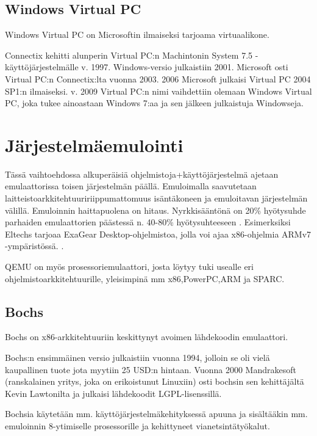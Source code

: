 \subsection{Windows Virtual PC}
Windows Virtual PC on Microsoftin ilmaiseksi tarjoama virtuaalikone.

Connectix kehitti alunperin Virtual PC:n Machintonin System 7.5 -käyttöjärjestelmälle v. 1997. Windows-versio julkaistiin 2001. Microsoft osti Virtual PC:n Connectix:lta vuonna 2003. 2006 Microsoft julkaisi Virtual PC 2004 SP1:n ilmaiseksi. v. 2009 Virtual PC:n nimi vaihdettiin olemaan Windows Virtual PC, joka tukee ainoastaan Windows 7:aa ja sen jälkeen julkaistuja Windowseja.


\section{Järjestelmäemulointi}

Tässä vaihtoehdossa alkuperäisiä ohjelmistoja+käyttöjärjestelmä ajetaan emulaattorissa toisen järjestelmän päällä. Emuloimalla saavutetaan laitteistoarkkitehtuuririippumattomuus isäntäkoneen ja emuloitavan järjestelmän välillä. Emuloinnin haittapuolena on hitaus. Nyrkkisääntönä on 20\% hyötysuhde \cite{tinycc} parhaiden emulaattorien päästessä n. 40-80\% hyötysuhteeseen \cite{40pperf}. Esimerksiksi Eltechs tarjoaa ExaGear Desktop-ohjelmistoa, jolla voi ajaa x86-ohjelmia ARMv7 -ympäristössä. \cite{eltechs:exagear}.


QEMU on myös prosessoriemulaattori, josta löytyy tuki usealle eri ohjelmistoarkkitehtuurille, yleisimpinä mm x86,PowerPC,ARM ja SPARC.


\subsection{Bochs}
Bochs on x86-arkkitehtuuriin keskittynyt avoimen lähdekoodin emulaattori.

Bochs:n ensimmäinen versio julkaistiin vuonna 1994, jolloin se oli vielä kaupallinen tuote jota myytiin 25 USD:n hintaan. Vuonna 2000 Mandrakesoft (ranskalainen yritys, joka on erikoistunut Linuxiin) osti bochsin sen kehittäjältä Kevin Lawtonilta ja julkaisi lähdekoodit LGPL-lisenssillä.

Bochsia käytetään mm. käyttöjärjestelmäkehityksessä apuuna ja sisältääkin mm. emuloinnin 8-ytimiselle prosessorille ja kehittyneet vianetsintätyökalut.



